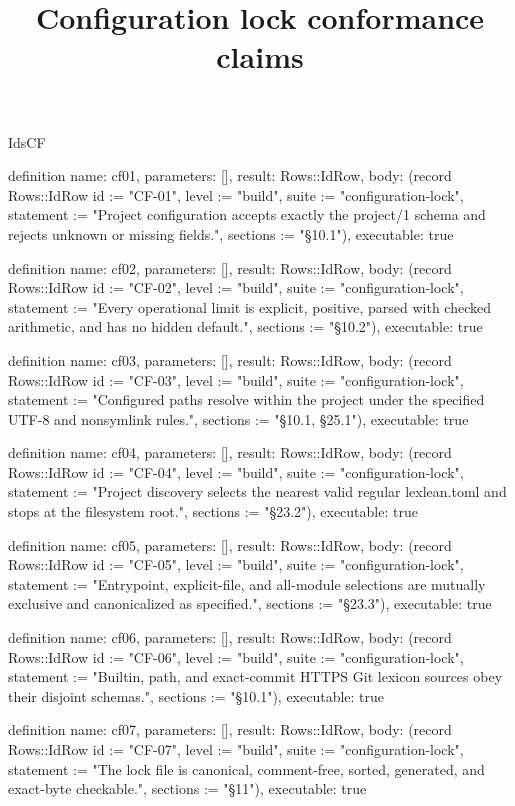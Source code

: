 \begin{lexlean}{IdsCF}
\title{Configuration lock conformance claims}
\begin{semanticmodule}
definition{
  name: cf01,
  parameters: [],
  result: Rows::IdRow,
  body: (record Rows::IdRow {id := "CF-01", level := "build", suite := "configuration-lock", statement := "Project configuration accepts exactly the project/1 schema and rejects unknown or missing fields.", sections := "§10.1"}),
  executable: true
}

definition{
  name: cf02,
  parameters: [],
  result: Rows::IdRow,
  body: (record Rows::IdRow {id := "CF-02", level := "build", suite := "configuration-lock", statement := "Every operational limit is explicit, positive, parsed with checked arithmetic, and has no hidden default.", sections := "§10.2"}),
  executable: true
}

definition{
  name: cf03,
  parameters: [],
  result: Rows::IdRow,
  body: (record Rows::IdRow {id := "CF-03", level := "build", suite := "configuration-lock", statement := "Configured paths resolve within the project under the specified UTF-8 and nonsymlink rules.", sections := "§10.1, §25.1"}),
  executable: true
}

definition{
  name: cf04,
  parameters: [],
  result: Rows::IdRow,
  body: (record Rows::IdRow {id := "CF-04", level := "build", suite := "configuration-lock", statement := "Project discovery selects the nearest valid regular lexlean.toml and stops at the filesystem root.", sections := "§23.2"}),
  executable: true
}

definition{
  name: cf05,
  parameters: [],
  result: Rows::IdRow,
  body: (record Rows::IdRow {id := "CF-05", level := "build", suite := "configuration-lock", statement := "Entrypoint, explicit-file, and all-module selections are mutually exclusive and canonicalized as specified.", sections := "§23.3"}),
  executable: true
}

definition{
  name: cf06,
  parameters: [],
  result: Rows::IdRow,
  body: (record Rows::IdRow {id := "CF-06", level := "build", suite := "configuration-lock", statement := "Builtin, path, and exact-commit HTTPS Git lexicon sources obey their disjoint schemas.", sections := "§10.1"}),
  executable: true
}

definition{
  name: cf07,
  parameters: [],
  result: Rows::IdRow,
  body: (record Rows::IdRow {id := "CF-07", level := "build", suite := "configuration-lock", statement := "The lock file is canonical, comment-free, sorted, generated, and exact-byte checkable.", sections := "§11"}),
  executable: true
}


\end{semanticmodule}
\end{lexlean}
